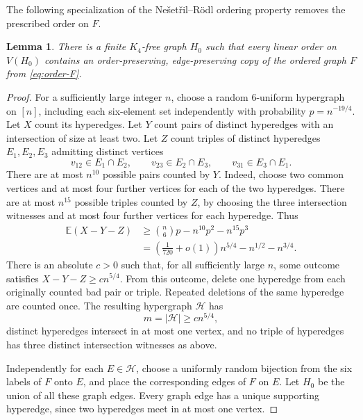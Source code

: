 \documentclass[10pt,letterpaper,leqno]{amsart}
\numberwithin{equation}{section}
\newtheorem{lemma}[theorem]{Lemma}
\theoremstyle{definition}
\theoremstyle{remark}
\begin{document}
The following specialization of the Ne\v{s}et\v{r}il--R\"odl ordering
property \cite{NR} removes the prescribed order on $F$.

\begin{lemma}\label{lem:ordering-property}
There is a finite $K_4$-free graph $H_0$ such that every linear order on
$V(H_0)$ contains an order-preserving, edge-preserving copy of the
ordered graph $F$ from \eqref{eq:order-F}.
\end{lemma}

\begin{proof}
For a sufficiently large integer $n$, choose a random $6$-uniform
hypergraph on $[n]$, including each six-element set independently with
probability $p=n^{-19/4}$. Let $X$ count its hyperedges. Let $Y$ count
pairs of distinct hyperedges with an intersection of size at least two.
Let $Z$ count triples of distinct hyperedges $E_1,E_2,E_3$ admitting
distinct vertices
\[
 v_{12}\in E_1\cap E_2,\qquad
 v_{23}\in E_2\cap E_3,\qquad
 v_{31}\in E_3\cap E_1.
\]
There are at most $n^{10}$ possible pairs counted by $Y$.
Indeed, choose two common vertices and at most four further vertices
for each of the two hyperedges. There are at most $n^{15}$ possible
triples counted by $Z$, by choosing the three intersection witnesses
and at most four further vertices for each hyperedge. Thus
\begin{align*}
 \mathbb E(X-Y-Z)
 &\ge \binom n6 p-n^{10}p^2-n^{15}p^3\\
 &=\left(\frac1{720}+o(1)\right)n^{5/4}
       -n^{1/2}-n^{3/4}.
\end{align*}
There is an absolute $c>0$ such that, for all sufficiently large $n$,
some outcome satisfies $X-Y-Z\ge c n^{5/4}$.
From this outcome, delete one hyperedge from each originally counted
bad pair or triple. Repeated deletions of the same hyperedge are counted
once. The resulting hypergraph $\mathcal H$ has
\begin{equation}\label{eq:many-hyperedges}
 m=|\mathcal H|\ge c n^{5/4},
\end{equation}
distinct hyperedges intersect in at most one vertex, and no triple of
hyperedges has three distinct intersection witnesses as above.

Independently for each $E\in\mathcal H$, choose a uniformly random
bijection from the six labels of $F$ onto $E$, and place the corresponding
edges of $F$ on $E$. Let $H_0$ be the union of all these graph edges.
Every graph edge has a unique supporting hyperedge, since two
hyperedges meet in at most one vertex.


\end{proof}
\end{document}
